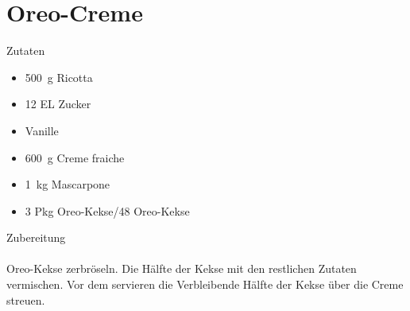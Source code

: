 \section*{Oreo-Creme}
\ihead{}\ohead{}
\cfoot{}
{\Large Zutaten}
\begin{multicols}{2}
\begin{itemize}
    \item \SI{500}{g} Ricotta
    \item \num{12} EL Zucker
    \item Vanille
    \item \SI{600}{g} Creme fraiche
    \item \SI{1}{kg} Mascarpone
    \item \num{3} Pkg Oreo-Kekse/\num{48} Oreo-Kekse
\end{itemize}
\end{multicols}
\noindent
{\Large Zubereitung}\\
\\
Oreo-Kekse zerbröseln.
Die Hälfte der Kekse mit den restlichen Zutaten vermischen.
Vor dem servieren die Verbleibende Hälfte der Kekse über die Creme streuen.
